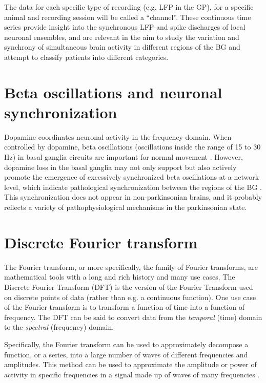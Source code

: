 \documentclass{kththesis}
\begin{document}
The data for each specific type of recording (e.g. LFP in the GP), for a specific animal and recording session will be called a “channel”. 
These continuous time series provide insight into the synchronous LFP and spike discharges of local neuronal ensembles, and are relevant in the aim to study the variation and synchrony of simultaneous brain activity in different regions of the BG and attempt to classify patients into different categories.

\section{Beta oscillations and neuronal synchronization}\label{BG BetaOsc NeurSyn}

Dopamine coordinates neuronal activity in the frequency domain. 
When controlled by dopamine, beta oscillations (oscillations inside the range of 15 to 30 Hz) in basal ganglia circuits are important for normal movement \parencite{Cagnan}. 
However, dopamine loss in the basal ganglia may not only support but also actively promote the emergence of excessively synchronized beta oscillations at a network level, which indicate pathological synchronization between the regions of the BG \parencite{Hammond}. 
This synchronization does not appear in non-parkinsonian brains, and it probably reflects a variety of pathophysiological mechanisms in the parkinsonian state.

\section{Discrete Fourier transform}\label{DFT BG}

The Fourier transform, or more specifically, the family of Fourier transforms, are mathematical tools with a long and rich history and many use cases. 
The Discrete Fourier Transform (DFT) is the version of the Fourier Transform used on discrete points of data (rather than e.g. a continuous function). 
One use case of the Fourier transform is to transform a function of time into a function of frequency. 
The DFT can be said to convert data from the \textit{temporal} (time) domain to the \textit{spectral} (frequency) domain.

Specifically, the Fourier transform can be used to approximately decompose a function, or a series, into a large number of waves of different frequencies and amplitudes. 
This method can be used to approximate the amplitude or power of activity in specific frequencies in a signal made up of waves of many frequencies \parencite{Fourier}.
\end{document}
